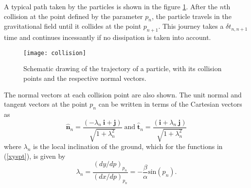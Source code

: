 \documentclass[reprint, aps, pre,nofootinbib]{revtex4-1}
\begin{document}
A typical path taken by the particles is shown in the figure \ref{FigCollision}.
After the $n$th collision at the point defined by the parameter $p_{n}$,
the particle travels in the gravitational field until it collides
at the point $p_{n+1}$. This journey takes a $\delta t_{n,n+1}$
time and continues incessantly if no dissipation is taken into account.
\begin{figure}[H]
\begin{centering}
\texttt{[image: collision]}
\par\end{centering}
\caption{Schematic drawing of the trajectory of a particle, with its collision
points and the respective normal vectors.}
\label{FigCollision}
\end{figure}
The normal vectors at each collision point are also shown. The unit
normal and tangent vectors at the point $p_{n}$ can be written in
terms of the Cartesian vectors as 
\begin{equation}
\hat{\boldsymbol{n}}_{n}=\frac{\left(-\lambda_{n}\:\boldsymbol{i}+\boldsymbol{j}\right)}{\sqrt{1+\lambda_{n}^{2}}}\;\textrm{and}\;\hat{\boldsymbol{t}}_{n}=\frac{\left(\boldsymbol{i}+\lambda_{n}\:\boldsymbol{j}\right)}{\sqrt{1+\lambda_{n}^{2}}}\label{normal1}
\end{equation}
where $\lambda_{n}$ is the local inclination of the ground, which
for the functions in (\ref{xyspt}), is given by
\begin{equation}
\lambda_{n}=\frac{(dy/dp)_{p_{n}}}{(dx/dp)_{p_{n}}}=-\frac{\beta}{\alpha}\textrm{sin}\left(p_{n}\right).\label{slope}
\end{equation}
\end{document}

